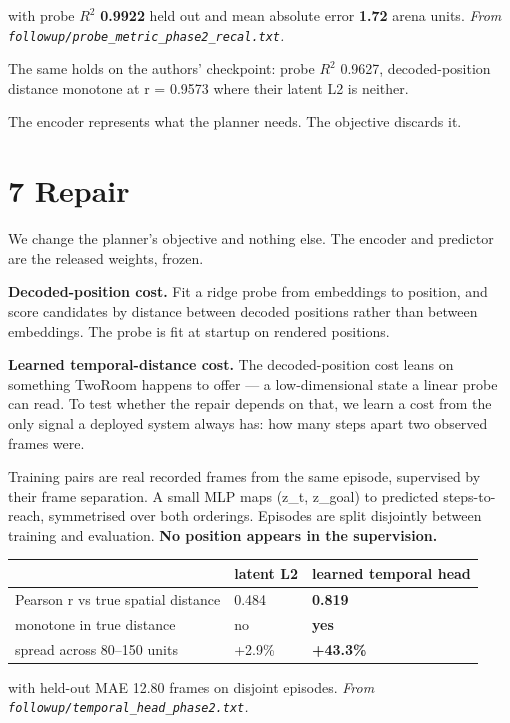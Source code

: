\documentclass[10pt]{article}
\newcounter{none}
\begin{document}
with probe $R^{2}$ \textbf{0.9922} held out and mean absolute error \textbf{1.72} arena
units. \emph{From \texttt{followup/probe\_metric\_phase2\_recal.txt}.}

The same holds on the authors' checkpoint: probe $R^{2}$ 0.9627, decoded-position
distance monotone at r = 0.9573 where their latent L2 is neither.

The encoder represents what the planner needs. The objective discards it.

\section{7 Repair}\label{repair}

We change the planner's objective and nothing else. The encoder and predictor
are the released weights, frozen.

\textbf{Decoded-position cost.} Fit a ridge probe from embeddings to position, and
score candidates by distance between decoded positions rather than between
embeddings. The probe is fit at startup on rendered positions.

\textbf{Learned temporal-distance cost.} The decoded-position cost leans on
something TwoRoom happens to offer --- a low-dimensional state a linear probe
can read. To test whether the repair depends on that, we learn a cost from the
only signal a deployed system always has: how many steps apart two observed
frames were.

Training pairs are real recorded frames from the same episode, supervised by
their frame separation. A small MLP maps (z\_t, z\_goal) to predicted
steps-to-reach, symmetrised over both orderings. Episodes are split disjointly
between training and evaluation. \textbf{No position appears in the supervision.}

{\def\LTcaptype{none} %
\begin{longtable}[]{@{}lll@{}}
\toprule\noalign{}
& latent L2 & learned temporal head \\
\midrule\noalign{}
\endhead
\bottomrule\noalign{}
\endlastfoot
Pearson r vs true spatial distance & 0.484 & \textbf{0.819} \\
monotone in true distance & no & \textbf{yes} \\
spread across 80--150 units & +2.9\% & \textbf{+43.3\%} \\
\end{longtable}
}

with held-out MAE 12.80 frames on disjoint episodes. \emph{From
\texttt{followup/temporal\_head\_phase2.txt}.}
\end{document}
